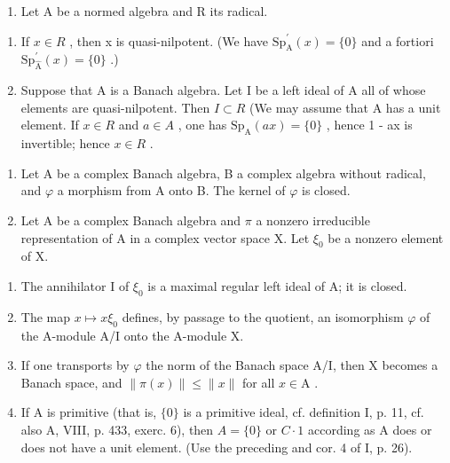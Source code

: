 \begin{enumerate}
\def\labelenumi{\arabic{enumi})}
\setcounter{enumi}{22}
\tightlist
\item
  Let A be a normed algebra and R its radical.
\end{enumerate}

\begin{enumerate}
\def\labelenumi{\alph{enumi})}
\item
  If \(x \in R\) , then x is quasi-nilpotent. (We have \(\mathrm{Sp}_{\mathrm{A}}^{\prime}(x) = \{0\}\) and a fortiori \(\mathrm{Sp}_{\widehat{\mathrm{A}}}^{\prime}(x) = \{0\}\) .)
\item
  Suppose that A is a Banach algebra. Let I be a left ideal of A all of whose elements are quasi-nilpotent. Then \(I \subset R\) (We may assume that A has a unit element. If \(x \in R\) and \(a \in A\) , one has \(\mathrm{Sp}_{\mathrm{A}}(ax) = \{0\}\) , hence 1 - ax is invertible; hence \(x \in R\) .
\end{enumerate}

\begin{enumerate}
\def\labelenumi{\arabic{enumi})}
\setcounter{enumi}{23}
\item
  Let A be a complex Banach algebra, B a complex algebra without radical, and \(\varphi\) a morphism from A onto B. The kernel of \(\varphi\) is closed.
\item
  Let A be a complex Banach algebra and \(\pi\) a nonzero irreducible representation of A in a complex vector space X. Let \(\xi_{0}\) be a nonzero element of X.
\end{enumerate}

\begin{enumerate}
\def\labelenumi{\alph{enumi})}
\item
  The annihilator I of \(\xi_0\) is a maximal regular left ideal of A; it is closed.
\item
  The map \(x \mapsto x\xi_{0}\) defines, by passage to the quotient, an isomorphism \(\varphi\) of the A-module A/I onto the A-module X.
\item
  If one transports by \(\varphi\) the norm of the Banach space A/I, then X becomes a Banach space, and \(\| \pi (x)\| \leqslant \| x\|\) for all \(x\in \mathrm{A}\) .
\item
  If A is primitive (that is, \(\{0\}\) is a primitive ideal, cf. definition I, p. 11, cf. also A, VIII, p. 433, exerc. 6), then \(A = \{0\}\) or \(C \cdot 1\) according as A does or does not have a unit element. (Use the preceding and cor. 4 of I, p. 26).
\end{enumerate}

